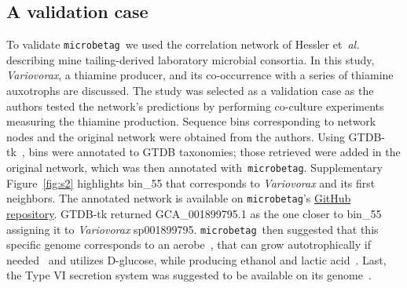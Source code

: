 \documentclass[sn-mathphys,Numbered]{sn-jnl}  %
\theoremstyle{thmstyleone}%
\theoremstyle{thmstyletwo}%
\theoremstyle{thmstylethree}%
\newcommand{\microbetag}{\texttt{microbetag}}
\begin{document}
    \subsection*{A validation case}
    \label{subsec:validation}


        To validate \microbetag~\space we used the correlation network of Hessler et~\textit{al.}~\cite{hessler2023vitamin} describing mine tailing-derived laboratory microbial consortia.
        In this study, \textit{Variovorax}, a thiamine producer, and its co-occurrence with a series of thiamine auxotrophs are discussed.
        The study was selected as a validation case as the authors tested the network's predictions by performing co-culture experiments measuring the thiamine production.
        Sequence bins corresponding to network nodes and the original network were obtained from the authors.
        Using GTDB-tk~\cite{chaumeil2020gtdb}, bins were annotated to GTDB taxonomies; those retrieved were added in the original network, which was then annotated with~\microbetag.
        Supplementary Figure~\ref{fig:s2} highlights bin\_55 that corresponds to \textit{Variovorax} and its first neighbors.
        The annotated network is available on \microbetag's \href{https://github.com/hariszaf/microbetag/blob/develop/tests/validation_case/microbetag_val.cx}{GitHub repository}.
        GTDB-tk returned GCA\_001899795.1 as the one closer to bin\_55 assigning it to \textit{Variovorax} sp001899795.
        \microbetag~\space then suggested that this specific genome corresponds to an aerobe~\cite{aerobeVariovorax}, that can grow autotrophically if needed~\cite{autotrophVariovorax} and utilizes D-glucose, while producing ethanol and lactic acid~\cite{lacticVariovorax}. 
        Last, the Type VI secretion system was suggested to be available on its genome~\cite{t6ssVariovorax}.
\end{document}
